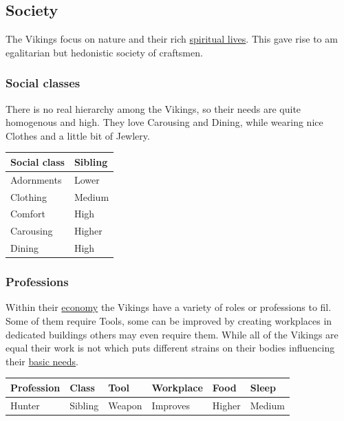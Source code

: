 \subsection{Society}\label{ch:Tribes:Vikings:Society}

The \gls{Vikings} focus on nature and their rich
\hyperref[ch:Tribes:Vikings:Religion]{spiritual lives}. This gave rise to am
egalitarian but hedonistic society of craftsmen.

\subsubsection{Social classes}\label{ch:Tribes:Vikings:Society:Classes}

There is no real hierarchy among the \gls{Vikings}, so their needs are quite
homogenous and high. They love \gls{Carousing} and \gls{Dining}, while wearing
nice \gls{Clothes} and a little bit of \gls{Jewlery}.

\begin{longtable}{ll}
	\toprule
	Social class     & Sibling \\
	\midrule
	\Gls{Adornments} & Lower   \\
	\Gls{Clothing}   & Medium  \\
	\Gls{Comfort}    & High    \\
	\Gls{Carousing}  & Higher  \\
	\Gls{Dining}     & High    \\
	\bottomrule
\end{longtable}

\subsubsection{Professions}\label{ch:Tribes:Vikings:Professions}

Within their \hyperref[ch:Tribes:Vikings:Economy]{economy} the \gls{Vikings}
have a variety of roles or professions to fil. Some of them require
\glspl{Tool}, some can be improved by creating workplaces in dedicated
buildings others may even require them. While all of the \gls{Vikings} are
equal their work is not which puts different strains on their bodies
influencing their
\hyperref[ch:World:ch:World:Inhabitants:Sapients:Humans]{basic needs}.

\begin{longtable}{llllll}
	\toprule
	Profession & Class   & \Gls{Tool}   & Workplace & \Gls{Food} & \Gls{Sleep} \\
	\midrule
	Hunter     & Sibling & \Gls{Weapon} & Improves  & Higher     & Medium      \\
	\bottomrule
\end{longtable}
